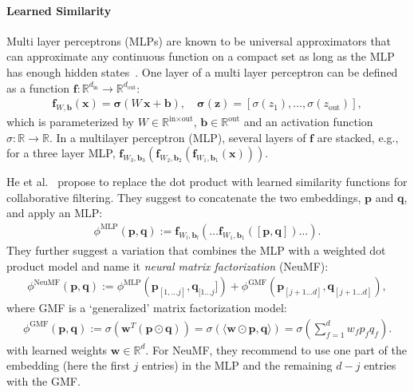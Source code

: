 \documentclass{article}
\newcommand{\bx}{\mathbf{x}}
\newcommand{\bz}{\mathbf{z}}
\newcommand{\bw}{\mathbf{w}}
\newcommand{\bb}{\mathbf{b}}
\newcommand{\embu}{\mathbf{p}}
\newcommand{\embi}{\mathbf{q}}
\newcommand{\sembu}{p}
\newcommand{\sembi}{q}
\begin{document}
\paragraph{Learned Similarity}

Multi layer perceptrons (MLPs) are known to be universal approximators that can approximate any continuous function on a compact set as long as the MLP has enough hidden states~\cite{cybenko1989approximation}.
One layer of a multi layer perceptron can be defined as a function $\textbf{f} : \mathbb{R}^{d_{\text{in}}} \rightarrow \mathbb{R}^{d_{\text{out}}}$:
\begin{align}
    \textbf{f}_{W,\bb}(\bx) = \boldsymbol{\sigma}(W \, \bx + \bb), \quad \boldsymbol{\sigma}(\bz) = [\sigma(z_1), \ldots, \sigma(z_\text{out})],
\end{align}
which is parameterized by $W \in \mathbb{R}^{\text{in} \times \text{out}}$, $\bb \in \mathbb{R}^{\text{out}}$ and an activation function $\sigma : \mathbb{R} \rightarrow \mathbb{R}$.
In a multilayer perceptron (MLP), several layers of $\textbf{f}$ are stacked, e.g., for a three layer MLP, $\textbf{f}_{W_3,\bb_3}(\textbf{f}_{W_2,\bb_2}(\textbf{f}_{W_1,\bb_1}(\bx)))$.

He et al.~\cite{he:www17} propose to replace the dot product with learned similarity functions for collaborative filtering.
They suggest to concatenate the two embeddings, $\embu$ and $\embi$, and apply an MLP:
\begin{align}
    \phi^{\text{MLP}}(\embu, \embi) := \textbf{f}_{W_l,\bb_l}(\ldots \textbf{f}_{W_1,\bb_1}([\embu, \embi])\ldots).
\end{align}
They further suggest a variation that combines the MLP with a weighted dot product model and name it \emph{neural matrix factorization} (NeuMF):
\begin{align}
\label{eq:ncf}
    \phi^{\text{NeuMF}}(\embu, \embi) := \phi^{\text{MLP}}(\embu_{[1, \ldots j]}, \embi_{[1 \ldots j}]) + \phi^{\text{GMF}}(\embu_{[j+1 \ldots d]}, \embi_{[j+1 \ldots d]}),
\end{align}
where GMF is a `generalized' matrix factorization model:
\begin{align}
    \phi^{\text{GMF}}(\embu, \embi) := \sigma( \bw^T  (\embu \odot \embi)) = \sigma(\langle \bw \odot \embu, \embi \rangle) = \sigma\left(\sum_{f=1}^d w_f \sembu_f \sembi_f\right). \label{eq:gmf}
\end{align}
with learned weights $\bw \in \mathbb{R}^d$.
For NeuMF, they recommend to use one part of the embedding (here the first $j$ entries) in the MLP and the remaining $d-j$ entries with the GMF.
\end{document}

